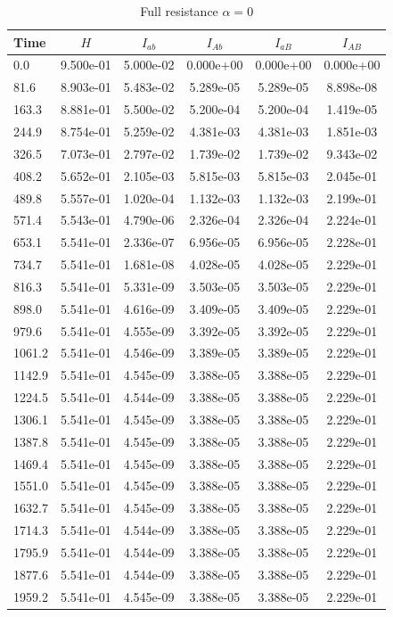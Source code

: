 \documentclass{report}
\begin{document}
\begin{table}[htbp]
\centering
\caption{Full resistance $\alpha=0$}
\label{tab:Full_resistance}
\begin{tabular}{lccccc}
\toprule
Time & $H$ & $I_{ab}$ & $I_{Ab}$ & $I_{aB}$ & $I_{AB}$ \\
\midrule
0.0 & 9.500e-01 & 5.000e-02 & 0.000e+00 & 0.000e+00 & 0.000e+00 \\
81.6 & 8.903e-01 & 5.483e-02 & 5.289e-05 & 5.289e-05 & 8.898e-08 \\
163.3 & 8.881e-01 & 5.500e-02 & 5.200e-04 & 5.200e-04 & 1.419e-05 \\
244.9 & 8.754e-01 & 5.259e-02 & 4.381e-03 & 4.381e-03 & 1.851e-03 \\
326.5 & 7.073e-01 & 2.797e-02 & 1.739e-02 & 1.739e-02 & 9.343e-02 \\
408.2 & 5.652e-01 & 2.105e-03 & 5.815e-03 & 5.815e-03 & 2.045e-01 \\
489.8 & 5.557e-01 & 1.020e-04 & 1.132e-03 & 1.132e-03 & 2.199e-01 \\
571.4 & 5.543e-01 & 4.790e-06 & 2.326e-04 & 2.326e-04 & 2.224e-01 \\
653.1 & 5.541e-01 & 2.336e-07 & 6.956e-05 & 6.956e-05 & 2.228e-01 \\
734.7 & 5.541e-01 & 1.681e-08 & 4.028e-05 & 4.028e-05 & 2.229e-01 \\
816.3 & 5.541e-01 & 5.331e-09 & 3.503e-05 & 3.503e-05 & 2.229e-01 \\
898.0 & 5.541e-01 & 4.616e-09 & 3.409e-05 & 3.409e-05 & 2.229e-01 \\
979.6 & 5.541e-01 & 4.555e-09 & 3.392e-05 & 3.392e-05 & 2.229e-01 \\
1061.2 & 5.541e-01 & 4.546e-09 & 3.389e-05 & 3.389e-05 & 2.229e-01 \\
1142.9 & 5.541e-01 & 4.545e-09 & 3.388e-05 & 3.388e-05 & 2.229e-01 \\
1224.5 & 5.541e-01 & 4.544e-09 & 3.388e-05 & 3.388e-05 & 2.229e-01 \\
1306.1 & 5.541e-01 & 4.545e-09 & 3.388e-05 & 3.388e-05 & 2.229e-01 \\
1387.8 & 5.541e-01 & 4.545e-09 & 3.388e-05 & 3.388e-05 & 2.229e-01 \\
1469.4 & 5.541e-01 & 4.545e-09 & 3.388e-05 & 3.388e-05 & 2.229e-01 \\
1551.0 & 5.541e-01 & 4.545e-09 & 3.388e-05 & 3.388e-05 & 2.229e-01 \\
1632.7 & 5.541e-01 & 4.545e-09 & 3.388e-05 & 3.388e-05 & 2.229e-01 \\
1714.3 & 5.541e-01 & 4.544e-09 & 3.388e-05 & 3.388e-05 & 2.229e-01 \\
1795.9 & 5.541e-01 & 4.544e-09 & 3.388e-05 & 3.388e-05 & 2.229e-01 \\
1877.6 & 5.541e-01 & 4.544e-09 & 3.388e-05 & 3.388e-05 & 2.229e-01 \\
1959.2 & 5.541e-01 & 4.545e-09 & 3.388e-05 & 3.388e-05 & 2.229e-01 \\
\bottomrule
\end{tabular}
\end{table}
\end{document}
